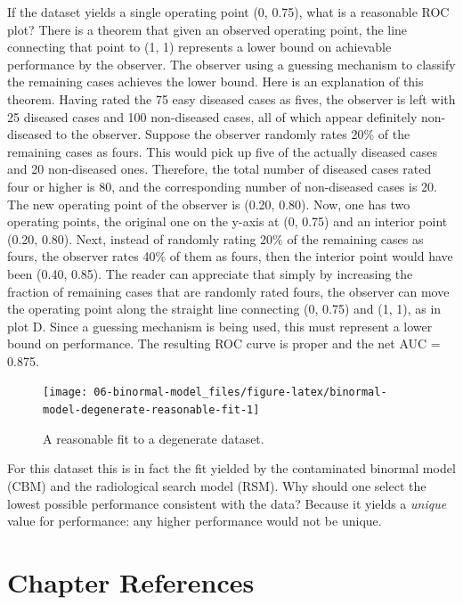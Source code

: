 \documentclass[
]{book}
\begin{document}
If the dataset yields a single operating point (0, 0.75), what is a reasonable ROC plot? There is a theorem that given an observed operating point, the line connecting that point to (1, 1) represents a lower bound on achievable performance by the observer. The observer using a guessing mechanism to classify the remaining cases achieves the lower bound. Here is an explanation of this theorem. Having rated the 75 easy diseased cases as fives, the observer is left with 25 diseased cases and 100 non-diseased cases, all of which appear definitely non-diseased to the observer. Suppose the observer randomly rates 20\% of the remaining cases as fours. This would pick up five of the actually diseased cases and 20 non-diseased ones. Therefore, the total number of diseased cases rated four or higher is 80, and the corresponding number of non-diseased cases is 20. The new operating point of the observer is (0.20, 0.80). Now, one has two operating points, the original one on the y-axis at (0, 0.75) and an interior point (0.20, 0.80). Next, instead of randomly rating 20\% of the remaining cases as fours, the observer rates 40\% of them as fours, then the interior point would have been (0.40, 0.85). The reader can appreciate that simply by increasing the fraction of remaining cases that are randomly rated fours, the observer can move the operating point along the straight line connecting (0, 0.75) and (1, 1), as in plot D. Since a guessing mechanism is being used, this must represent a lower bound on performance. The resulting ROC curve is proper and the net AUC = 0.875.

\begin{figure}

{\centering \texttt{[image: 06-binormal-model\_files/figure-latex/binormal-model-degenerate-reasonable-fit-1]} 

}

\caption{A reasonable fit to a degenerate dataset.}\label{fig:binormal-model-degenerate-reasonable-fit}
\end{figure}

For this dataset this is in fact the fit yielded by the contaminated binormal model (CBM) and the radiological search model (RSM). Why should one select the lowest possible performance consistent with the data? Because it yields a \emph{unique} value for performance: any higher performance would not be unique.

\hypertarget{binormal-model-references}{%
\section{Chapter References}\label{binormal-model-references}}

  
\end{document}

